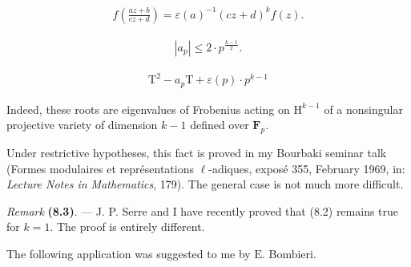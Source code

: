 \documentclass[10pt,leqno]{article}
\begin{document}
\begin{equation*}\begin{gathered}f\left(\frac{az+b}{cz+d}\right) = \varepsilon (a)^{-1}(cz+d)^{k} f(z).\end{gathered}\end{equation*}

\par

\begin{equation*}\begin{gathered}|a_{p}| \leq  2\cdot p^{\frac{k-1}{2}}.\end{gathered}\end{equation*}

\par

\begin{equation*}\begin{gathered}\mathrm{T}^{2} - a_{p} \mathrm{T} + \varepsilon (p)\cdot p^{k-1}\end{gathered}\end{equation*}

\par

\noindent Indeed, these roots are eigenvalues of Frobenius acting on \(\mathrm{H}^{k-1}\) of a nonsingular projective variety of dimension \(k-1\) defined over \(\mathbf{F}_{p}\).\par

\noindent Under restrictive hypotheses, this fact is proved in my Bourbaki seminar talk (Formes modulaires et représentations \(\ell \)-adiques, exposé 355, February 1969, in: \emph{Lecture Notes in Mathematics}, 179). The general case is not much more difficult.\par

\noindent \emph{Remark} \textbf{(8.3)}. — J. P. Serre and \(\mathrm{I}\) have recently proved that (8.2) remains true for \(k = 1\). The proof is entirely different.\par

\noindent The following application was suggested to me by \(\mathrm{E}\). Bombieri.\par
\end{document}
